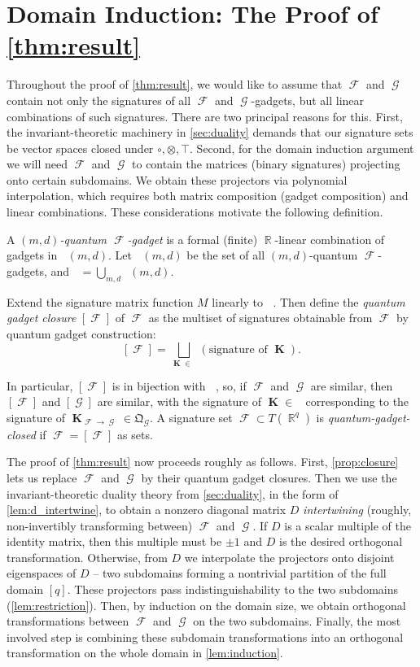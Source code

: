 \documentclass{article}
\DeclareMathOperator{\rr}{\mathbb{R}}
\DeclareMathOperator{\vk}{\mathbf{K}}
\DeclareMathOperator{\fc}{\mathcal{F}}
\DeclareMathOperator{\gc}{\mathcal{G}}
\DeclareMathOperator{\gk}{\mathfrak{G}_{\mathcal{F}}}
\DeclareMathOperator{\qk}{\mathfrak{Q}_{\mathcal{F}}}
\begin{document}
\section{Domain Induction: The Proof of \autoref{thm:result}}
\label{sec:proof}
Throughout the proof of \autoref{thm:result}, we would like to assume that $\fc$ and $\gc$
contain not only the signatures of all $\fc$ and $\gc$-gadgets, but all linear combinations
of such signatures. There are two principal reasons for this. First, the
invariant-theoretic machinery in \autoref{sec:duality} demands that our signature sets be
vector spaces closed under $\circ,\otimes,\top$. 
Second, for the domain induction argument we will need $\fc$ and $\gc$ to contain the
matrices (binary signatures) projecting onto certain subdomains. We obtain these projectors
via polynomial interpolation, which requires both matrix composition
(gadget composition) and linear combinations.
These considerations motivate the following definition.
\begin{definition}[$\qk(m,d), {[\fc]}$]
    \label{def:quantum_gadget}
    A \emph{$(m,d)$-quantum $\fc$-gadget} is a formal (finite) $\rr$-linear combination of gadgets in
    $\gk(m,d)$. Let $\qk(m,d)$ be the set of all $(m,d)$-quantum $\fc$-gadgets,
    and $\qk = \bigcup_{m,d}\qk(m,d)$.

    Extend the signature matrix function $M$ linearly to $\qk$. 
    Then define the \emph{quantum gadget closure} $[\fc]$ of $\fc$ as the
    multiset of signatures obtainable from $\fc$ by quantum gadget construction:
    \[
        [\fc] = \bigsqcup_{\vk \in \qk} (\text{signature of $\vk$}).
    \]
\end{definition}
In particular, $[\fc]$ is in bijection with $\qk$, so,
if $\fc$ and $\gc$ are similar, then $[\fc]$ and
$[\gc]$ are similar, with the signature of $\vk \in \qk$ corresponding to the signature of
$\vk_{\fc\to\gc} \in \mathfrak{Q}_{\gc}$.
A signature set $\fc \subset T(\rr^q)$ is \emph{quantum-gadget-closed} if $\fc = [\fc]$ as
sets.

The proof of \autoref{thm:result} now proceeds roughly as follows. First, \autoref{prop:closure}
lets us replace $\fc$ and $\gc$ by their quantum gadget closures. Then we use the
invariant-theoretic duality theory from \autoref{sec:duality}, in the form of
\autoref{lem:d_intertwine}, to obtain a nonzero diagonal matrix $D$ \emph{intertwining}
(roughly, non-invertibly transforming between) $\fc$ and $\gc$. If $D$ is a scalar multiple
of the identity matrix, then this multiple must be $\pm 1$ and $D$ is the desired
orthogonal transformation. Otherwise, from $D$ we
interpolate the projectors onto disjoint eigenspaces of $D$ -- two subdomains forming a 
nontrivial partition of the full domain $[q]$. 
These projectors pass indistinguishability to the two subdomains (\autoref{lem:restriction}).
Then, by induction on the domain size, we obtain orthogonal transformations between $\fc$
and $\gc$ on the two subdomains. Finally, the most involved step is combining these
subdomain transformations into
an orthogonal transformation on the whole domain in \autoref{lem:induction}.
\end{document}
